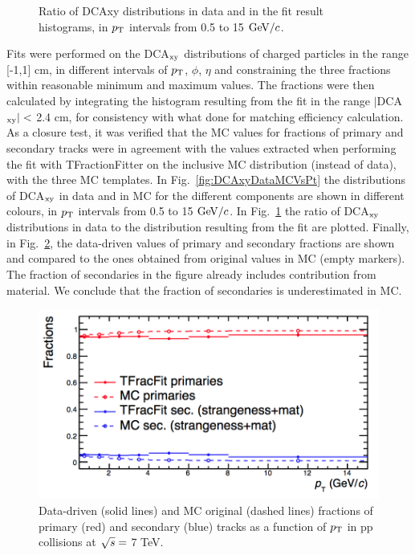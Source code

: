 \begin{enumerate}
\begin{figure}[!hb]
\begin{center}
\caption{Ratio of DCAxy distributions in data and in the fit result histograms, in $p_{\rm T}$ intervals from 0.5 to 15 $\mathrm{GeV}/c$.}
\label{fig:DCAxyRatioDataFitVsPt}
\end{center}
\end{figure}
Fits were performed on the DCA$_{\rm xy}$ distributions of charged particles 
in the range [-1,1] cm, in different intervals of $p_{\rm T}$, $\phi$, $\eta$ 
and constraining the three fractions within reasonable minimum and maximum values.
The fractions were then calculated by integrating the histogram 
resulting from the fit in the range $|$DCA$_{\rm xy}|<$ 2.4 cm, for
consistency with what done for matching efficiency calculation. 
As a closure test, it was verified that the MC values for fractions of primary and secondary tracks 
were in agreement with the values extracted when performing the fit with TFractionFitter 
on the inclusive MC distribution (instead of data), with the three MC templates.  
In Fig.~\ref{fig:DCAxyDataMCVsPt} the distributions of DCA$_{\rm xy}$ 
in data and in MC for the different components are
shown in different colours, in $p_{\rm T}$ intervals from 0.5 to 15 $\mathrm{GeV}/c$. 
In Fig.~\ref{fig:DCAxyRatioDataFitVsPt} the ratio of DCA$_{\rm xy}$ distributions 
in data to the distribution resulting from the fit are plotted. 
Finally, in Fig.~\ref{fig:Fractions}, the data-driven values of primary and secondary
 fractions are shown and compared to 
 the ones obtained from original values in MC (empty markers). 
The fraction of secondaries in the figure already includes contribution 
from material. We conclude that the fraction of secondaries is underestimated in MC.
\begin{figure}[!hb]
\begin{center}
\includegraphics[width=.6\textwidth]{FigCap4/MEfractions.png}
\caption{Data-driven (solid lines) and MC original (dashed lines) fractions of primary (red) and secondary (blue) tracks as a function of $p_{\rm T}$ in pp collisions at $\sqrt{s} = $ 7 TeV.}
\label{fig:Fractions}
\end{center}
\end{figure}


\end{enumerate}
